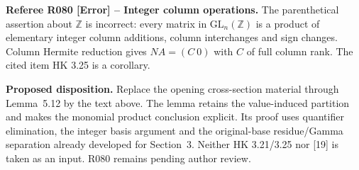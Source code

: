 \documentclass[12pt]{amsart}
\numberwithin{equation}{section}
\begin{document}
\medskip
{\normalfont\small\color{RefereePurple}
\noindent\textbf{Referee R080 [Error] -- Integer column operations.}
The parenthetical assertion about $\mathbb Z$ is incorrect:
every matrix in $\mathrm{GL}_n(\mathbb Z)$ is a product of
elementary integer column additions, column interchanges and sign
changes. Column Hermite reduction gives $NA=(C\ 0)$ with $C$ of
full column rank. The cited item HK 3.25 is a corollary.
\par}
\medskip
{\normalfont\small\color{ProposalOrange}
\noindent\textbf{Proposed disposition.}
Replace the opening cross-section material through Lemma~5.12
by the text above. The lemma retains the value-induced partition
and makes the monomial product conclusion explicit. Its proof uses
quantifier elimination, the integer basis argument and the
original-base residue/Gamma separation already developed for
Section~3. Neither HK 3.21/3.25 nor [19] is taken as an input.
R080 remains pending author review.}
\end{document}
